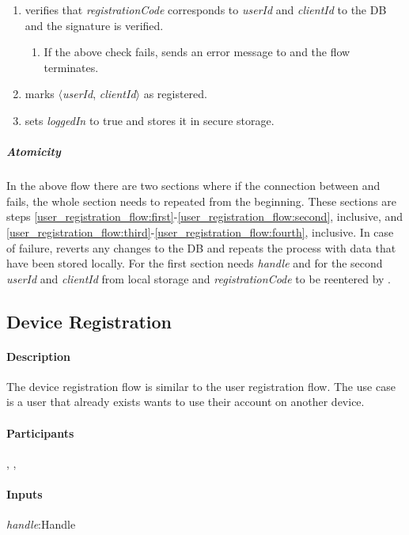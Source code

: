 \documentclass[a4paper,10pt]{article}
\newcommand{\handle}{\emph{handle}}
\newcommand{\registrationCode}{\emph{registrationCode}}
\newcommand{\userId}{\emph{userId}}
\newcommand{\clientId}{\emph{clientId}}
\newcommand{\loggedIn}{\emph{loggedIn}}
\begin{document}
\begin{enumerate}
 \item \Server{} verifies that \registrationCode{} corresponds to \userId{} and \clientId{} to the DB and the signature is verified.
 \begin{enumerate}
  \item If the above check fails, \Server{} sends an error message to \Client{} and the flow terminates.
 \end{enumerate}
 \item\label{user_registration_flow:fourth} \Server{} marks $\langle$\userId{}, \clientId{}$\rangle$ as registered.
 \item \Client{} sets \loggedIn{} to true and stores it in secure storage.
\end{enumerate}

\subparagraph{Atomicity}
In the above flow there are two sections where if the connection between \Server{} and \Client{} fails, the whole section needs to repeated from the beginning. These sections are 
steps \ref{user_registration_flow:first}-\ref{user_registration_flow:second}, inclusive, and \ref{user_registration_flow:third}-\ref{user_registration_flow:fourth}, inclusive. In 
case of failure, \Server{} reverts any changes to the DB and \Client{} repeats the process with data that have been stored locally. For the first section \Client{} needs \handle{} 
and for the second \userId{} and \clientId{} from local storage and \registrationCode{} to be reentered by \User{}.

\subsection{Device Registration}

\paragraph{Description}
The device registration flow is similar to the user registration flow. The use case is a user that already exists wants to use their account on another device.

\paragraph{Participants} \Server{}, \Client{}, \User{}

\paragraph{Inputs}
\SpecialItem
\begin{description}
 \item[\handle{}:Handle]
\end{description}
\end{document}
